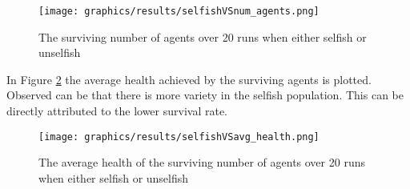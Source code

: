 \begin{figure}[H]
    \centering
    \texttt{[image: graphics/results/selfishVSnum\_agents.png]}
    \caption{The surviving number of agents over 20 runs when either selfish or unselfish}
    \label{fig:selfish_vs_num_agents}
\end{figure}

\textcolor{purple}{
    \blindtext
    \blindtext
}

In Figure \ref{fig:selfish_vs_average_health} the average health achieved by the surviving agents is plotted.
Observed can be that there is more variety in the selfish population.
This can be directly attributed to the lower survival rate.


\begin{figure}[H]
    \centering
    \texttt{[image: graphics/results/selfishVSavg\_health.png]}
    \caption{The average health of the surviving number of agents over 20 runs when either selfish or unselfish}
    \label{fig:selfish_vs_average_health}
\end{figure}

\textcolor{purple}{
    \blindtext
    \blindtext
}